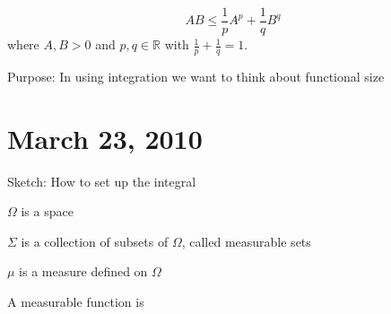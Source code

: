 \documentclass[12pt,leqno]{article}
\numberwithin{equation}{section}
\theoremstyle{definition}
\begin{document}
\[AB\leq\frac{1}{p}A^p+\frac{1}{q}B^q\] where $A,B>0$ and $p,q\in\mathbb{R}$ with $\frac{1}{p}+\frac{1}{q}=1$.

Purpose: In using integration we want to think about functional size

{\center\section{March 23, 2010}}

Sketch: How to set up the integral

$\Omega$ is a space

$\Sigma$ is a collection of subsets of $\Omega$, called measurable sets

$\mu$ is a measure defined on $\Omega$

A measurable function is 
\end{document}
